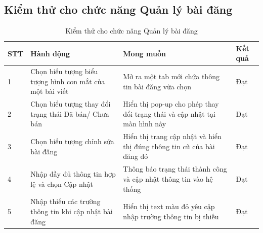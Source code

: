 \documentclass[../DoAn.tex]{subfiles}
\begin{document}
\begin{table}[H]
\subsection{Kiểm thử cho chức năng Quản lý bài đăng}
\begin{table}[H]
\begin{tabular}{|p{1cm}|p{5cm}|p{6cm}|p{1.5cm}|}
\hline
STT & Hành động                                                & Mong muốn                                                                 & Kết quả \\ \hline
1   & Chọn biểu tượng biểu tượng hình con mắt của một bài viết & Mở ra một tab mới chứa thông tin bài đăng vừa chọn                        & Đạt     \\ \hline
2   & Chọn biểu tượng thay đổi trạng thái Đã bán/ Chưa bán     & Hiển thị pop-up cho phép thay đổi trạng thái và cập nhật tại màn hình này & Đạt     \\ \hline
3   & Chọn biểu tượng chỉnh sửa bài đăng                       & Hiển thị trang cập nhật và hiển thị đúng thông tin cũ của bài đăng đó     & Đạt     \\ \hline
4   & Nhập đầy đủ thông tin hợp lệ và chọn Cập nhật            & Thông báo trạng thái thành công và cập nhật thông tin vào hệ thống        & Đạt     \\ \hline
5   & Nhập thiếu các trường thông tin khi cập nhật bài đăng    & Hiển thị text màu đỏ yêu cập nhập trường thông tin bị thiếu               & Đạt     \\ \hline
\end{tabular}
\caption{Kiểm thử cho chức năng Quản lý bài đăng}
\label{tab:my-table}
\end{table}
\label{tab:my-table}
\end{table}
\end{document}
